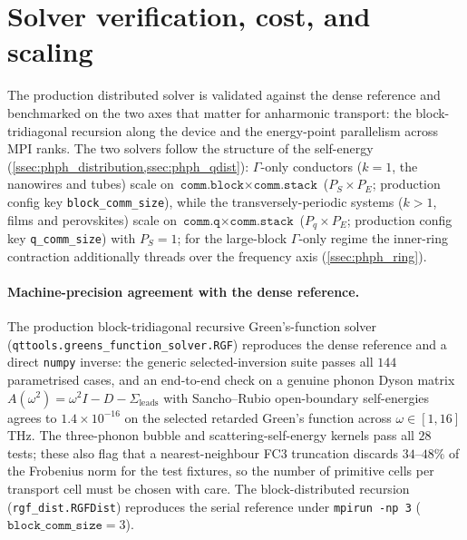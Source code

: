 \section{Solver verification, cost, and scaling}
\label{sec:res_scaling}

The production distributed solver is validated against the dense reference and
benchmarked on the two axes that matter for anharmonic transport: the
block-tridiagonal recursion along the device and the energy-point parallelism
across MPI ranks. The two solvers follow the structure of the self-energy
(\cref{ssec:phph_distribution,ssec:phph_qdist}): $\Gamma$-only conductors ($k{=}1$,
the nanowires and tubes) scale on
$\texttt{comm.block}\times\texttt{comm.stack}$ ($P_S\times P_E$; production
config key \texttt{block\_comm\_size}),
while the transversely-periodic systems ($k{>}1$, films and perovskites) scale on
$\texttt{comm.q}\times\texttt{comm.stack}$ ($P_q\times P_E$; production config
key \texttt{q\_comm\_size}) with $P_S{=}1$;
for the large-block $\Gamma$-only regime the inner-ring contraction additionally
threads over the frequency axis (\cref{ssec:phph_ring}).

\paragraph{Machine-precision agreement with the dense reference.} The production
block-tridiagonal recursive Green's-function solver
(\texttt{qttools.greens\_function\_solver.RGF}) reproduces the dense reference and a
direct \texttt{numpy} inverse: the generic selected-inversion suite passes all
$144$ parametrised cases, and an end-to-end check on a genuine phonon Dyson matrix
$A(\omega^2)=\omega^2 I-D-\Sigma_\mathrm{leads}$ with Sancho--Rubio
open-boundary self-energies agrees to $1.4\times10^{-16}$ on the selected retarded
Green's function across $\omega\in[1,16]$\,THz. The three-phonon bubble and
scattering-self-energy kernels pass all $28$ tests; these also flag that a
nearest-neighbour FC3 truncation discards $34$--$48\%$ of the Frobenius norm for the
test fixtures, so the number of primitive cells per transport cell must be chosen
with care. The block-distributed recursion
(\texttt{rgf\_dist.RGFDist}) reproduces the serial reference under
\texttt{mpirun -np 3} ($\texttt{block\_comm\_size}{=}3$).

